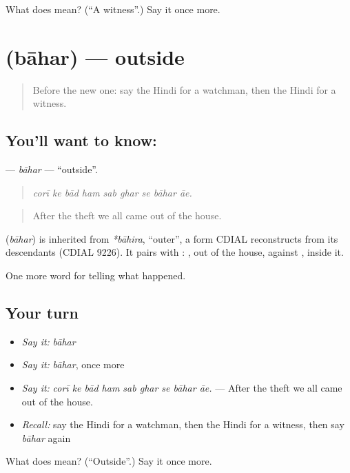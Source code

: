 \begin{tcolorbox}[breakable,colback=teal!4,colframe=teal!35!black,title={Before you move on}]
What does  mean? (\textquotedblleft{}A witness\textquotedblright{}.) Say it once more.
\end{tcolorbox}
\section[\texorpdfstring{\hi{बाहर} (bāhar)}{बाहर (bāhar)}]{ (bāhar) — outside}

\label{lesson:HI-C288-bahar}



\begin{quote}
Before the new one: say the Hindi for a watchman, then the Hindi for a witness.
\end{quote}

\subsection*{You'll want to know: }
\textbf{} — \emph{bāhar} — \textquotedblleft{}outside\textquotedblright{}.

\begin{quote}
        
\end{quote}

\begin{quote}
\emph{corī ke bād ham sab ghar se bāhar āe.}
\end{quote}

\begin{quote}
After the theft we all came out of the house.
\end{quote}

\begin{cousinweb}
\textbf{} (\emph{bāhar}) is inherited from \emph{*bāhira}, \textquotedblleft{}outer\textquotedblright{}, a form CDIAL reconstructs from its descendants (CDIAL 9226). It pairs with \textbf{}: \textbf{  }, out of the house, against \textbf{  }, inside it.
\end{cousinweb}

\begin{grammarlens}[title={What you've built}]
One more word for telling what happened.
\end{grammarlens}

\subsection*{Your turn}
\begin{itemize}
\raggedright
  \item \emph{Say it:} \emph{bāhar}
  \item \emph{Say it:} \emph{bāhar}, once more
  \item \emph{Say it:} \emph{corī ke bād ham sab ghar se bāhar āe.} — After the theft we all came out of the house.
  \item \emph{Recall:} say the Hindi for a watchman, then the Hindi for a witness, then say \emph{bāhar} again
\end{itemize}

\begin{tcolorbox}[breakable,colback=teal!4,colframe=teal!35!black,title={Before you move on}]
What does  mean? (\textquotedblleft{}Outside\textquotedblright{}.) Say it once more.
\end{tcolorbox}
